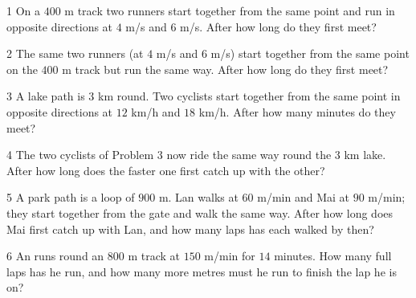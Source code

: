 \begin{probbox}{1}{\relax}
On a $400$ m track two runners start together from the same point and run in opposite directions at $4$ m/s and $6$ m/s. After how long do they first meet?
\end{probbox}
\gap
\begin{probbox}{2}{\relax}
The same two runners (at $4$ m/s and $6$ m/s) start together from the same point on the $400$ m track but run the same way. After how long do they first meet?
\end{probbox}
\gap
\begin{probbox}{3}{\relax}
A lake path is $3$ km round. Two cyclists start together from the same point in opposite directions at $12$ km/h and $18$ km/h. After how many minutes do they meet?
\end{probbox}
\gap
\begin{probbox}{4}{\relax}
The two cyclists of Problem 3 now ride the same way round the $3$ km lake. After how long does the faster one first catch up with the other?
\end{probbox}
\gap
\begin{probbox}{5}{\relax}
A park path is a loop of $900$ m. Lan walks at $60$ m/min and Mai at $90$ m/min; they start together from the gate and walk the same way. After how long does Mai first catch up with Lan, and how many laps has each walked by then?
\end{probbox}
\gap
\begin{probbox}{6}{\relax}
An runs round an $800$ m track at $150$ m/min for $14$ minutes. How many full laps has he run, and how many more metres must he run to finish the lap he is on?
\end{probbox}
